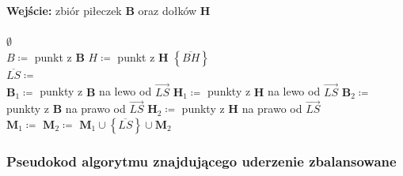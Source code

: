 \documentclass[10pt,a4paper]{article}
\begin{document}
	\begin{algorithmic}
		\State \textbf{Wejście:} zbiór piłeczek $\mathbf{B}$ oraz dołków $\mathbf{H}$  \\
		
		\\
			 
				\State \Return $\emptyset$ 
			\EndIf
			\\
			 
				\State $B \coloneqq $ punkt z $\mathbf{B}$
				\State $H \coloneqq $ punkt z $\mathbf{H}$
				\State \Return $\left\{\overline{BH}\right\}$ 
			\EndIf
			\\
			\State $\overline{LS} \coloneqq$  
			\\
			\State $\mathbf{B}_{1} \coloneqq $ punkty z $\mathbf{B}$ na lewo od $\overrightarrow{LS}$ 
			\State $\mathbf{H}_{1} \coloneqq $ punkty z $\mathbf{H}$ na lewo od $\overrightarrow{LS}$ 
			\State $\mathbf{B}_{2} \coloneqq $ punkty z $\mathbf{B}$ na prawo od $\overrightarrow{LS}$ 
			\State $\mathbf{H}_{2} \coloneqq $ punkty z $\mathbf{H}$ na prawo od $\overrightarrow{LS}$ 
			\\
			\State $\mathbf{M}_{1} \coloneqq $ 
			\State $\mathbf{M}_{2} \coloneqq $  
			\State \Return $\mathbf{M}_{1} \cup \left\{\overline{LS}\right\} \cup \mathbf{M}_{2}$  \\ 
		\EndFunction
	\end{algorithmic}

\pagebreak

	\subsubsection{Pseudokod algorytmu znajdującego uderzenie zbalansowane}
	
\end{document}
